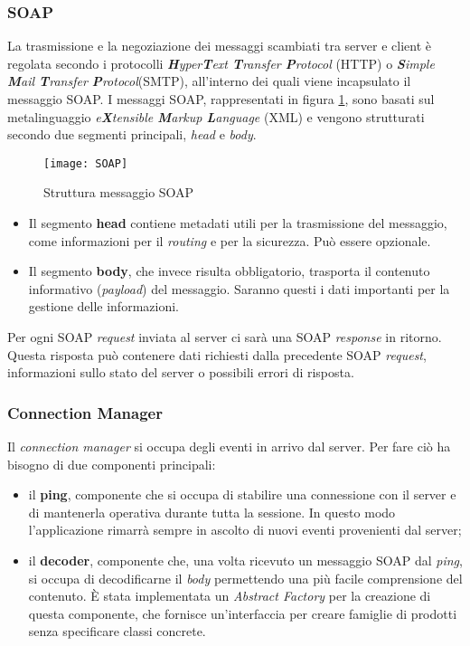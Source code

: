 \subsubsection{SOAP}
La trasmissione e la negoziazione dei messaggi scambiati tra server e client è regolata secondo i protocolli \emph{\textbf{H}yper\textbf{T}ext \textbf{T}ransfer \textbf{P}rotocol} (\acrshort{HTTP}) o \emph{\textbf{S}imple \textbf{M}ail \textbf{T}ransfer \textbf{P}rotocol}(\acrshort{SMTP}), all'interno dei quali viene incapsulato il messaggio SOAP.
I messaggi SOAP, rappresentati in figura \ref{fig:SOAP}, sono basati sul metalinguaggio \emph{e\textbf{X}tensible \textbf{M}arkup \textbf{L}anguage} (\acrshort{XML}) e vengono strutturati secondo due segmenti principali, \emph{head} e \emph{body}. 
\begin{figure}[H] 
	\centering
	\texttt{[image: SOAP]}
	\caption{Struttura messaggio SOAP}
	\label{fig:SOAP}
\end{figure}
\begin{itemize}
	\item Il segmento \textbf{head} contiene metadati utili per la trasmissione del messaggio, come informazioni per il \emph{routing} e per la sicurezza. Può essere opzionale.
	\item Il segmento \textbf{body}, che invece risulta obbligatorio, trasporta il contenuto informativo (\emph{payload}) del messaggio. Saranno questi i dati importanti per la gestione delle informazioni.
\end{itemize}
Per ogni SOAP \emph{request} inviata al server ci sarà una SOAP \emph{response} in ritorno. Questa risposta può contenere dati richiesti dalla precedente SOAP \emph{request}, informazioni sullo stato del server o possibili errori di risposta.
\subsubsection{Connection Manager}
Il \emph{connection manager} si occupa degli eventi in arrivo dal server. Per fare ciò ha bisogno di due componenti principali:
\begin{itemize}
	\item il \textbf{ping}, componente che si occupa di stabilire una connessione con il server e di mantenerla operativa durante tutta la sessione. In questo modo l'applicazione rimarrà sempre in ascolto di nuovi eventi provenienti dal server;
	\item il \textbf{decoder}, componente che, una volta ricevuto un messaggio SOAP dal \emph{ping}, si occupa di decodificarne il \emph{body} permettendo una più facile comprensione del contenuto. È stata implementata un \emph{Abstract Factory} per la creazione di questa componente,  che fornisce un’interfaccia per creare famiglie di prodotti senza specificare classi concrete.
\end{itemize}
